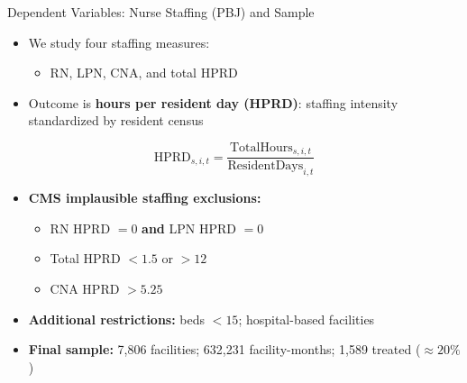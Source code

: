 \documentclass{beamer}
\begin{document}
\begin{frame}[t]{Dependent Variables: Nurse Staffing (PBJ) and Sample}

\small
\begin{itemize}
	\item We study four staffing measures:
	
	\begin{itemize}
		\item RN, LPN, CNA, and total HPRD
	\end{itemize}

	\vspace{0.25em}
	\item Outcome is \textbf{hours per resident day (HPRD)}: staffing intensity standardized by resident census
\end{itemize}

\vspace{0.10em}
\[
\text{HPRD}_{s,i,t}=\frac{\text{TotalHours}_{s,i,t}}{\text{ResidentDays}_{i,t}}
\]

\vspace{-0.05em}

\pause

\begin{itemize}
	\item \textbf{CMS implausible staffing exclusions:}
	\begin{itemize}
		\item RN HPRD $=0$ \textbf{and} LPN HPRD $=0$
		\item Total HPRD $<1.5$ or $>12$
		\item CNA HPRD $>5.25$
	\end{itemize}

	\vspace{0.15em}
	\item \textbf{Additional restrictions:} beds $<15$; hospital-based facilities

	\vspace{0.15em}
	\item \textbf{Final sample:} 7,806 facilities; 632,231 facility-months; 1,589 treated (\(\approx 20\%\))

\end{itemize}
\end{frame}
\end{document}
